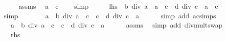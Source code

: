 \begin{isabellebody}
%
\isatagproof
{}\isamarkupfalse%
\ {\isacharminus}{\kern0pt}\isanewline
\ \ \isamarkupfalse%
\ assms\ \isamarkupfalse%
\ {\isachardoublequoteopen}a\ {\isacharasterisk}{\kern0pt}\ c\ {\isasymnoteq}\ {}{\isachardoublequoteclose}\ \isamarkupfalse%
\ simp\isanewline
\ \ \isamarkupfalse%
\ \isamarkupfalse%
\ {\isachardoublequoteopen}{\isacharquery}{\kern0pt}lhs\ {\isasymlongleftrightarrow}\ b\ div\ a\ {\isacharasterisk}{\kern0pt}\ {\isacharparenleft}{\kern0pt}a\ {\isacharasterisk}{\kern0pt}\ c{\isacharparenright}{\kern0pt}\ {\isacharequal}{\kern0pt}\ d\ div\ c\ {\isacharasterisk}{\kern0pt}\ {\isacharparenleft}{\kern0pt}a\ {\isacharasterisk}{\kern0pt}\ c{\isacharparenright}{\kern0pt}{\isachardoublequoteclose}\isanewline
\ \ \ \ \isamarkupfalse%
\ simp\isanewline
\ \ \isamarkupfalse%
\ \isamarkupfalse%
\ {\isachardoublequoteopen}{\isasymdots}\ {\isasymlongleftrightarrow}\ {\isacharparenleft}{\kern0pt}a\ {\isacharasterisk}{\kern0pt}\ {\isacharparenleft}{\kern0pt}b\ div\ a{\isacharparenright}{\kern0pt}{\isacharparenright}{\kern0pt}\ {\isacharasterisk}{\kern0pt}\ c\ {\isacharequal}{\kern0pt}\ {\isacharparenleft}{\kern0pt}c\ {\isacharasterisk}{\kern0pt}\ {\isacharparenleft}{\kern0pt}d\ div\ c{\isacharparenright}{\kern0pt}{\isacharparenright}{\kern0pt}\ {\isacharasterisk}{\kern0pt}\ a{\isachardoublequoteclose}\isanewline
\ \ \ \ \isamarkupfalse%
\ {\isacharparenleft}{\kern0pt}simp\ add{\isacharcolon}{\kern0pt}\ ac{\isacharunderscore}{\kern0pt}simps{\isacharparenright}{\kern0pt}\isanewline
\ \ \isamarkupfalse%
\ \isamarkupfalse%
\ {\isachardoublequoteopen}{\isasymdots}\ {\isasymlongleftrightarrow}\ {\isacharparenleft}{\kern0pt}a\ {\isacharasterisk}{\kern0pt}\ b\ div\ a{\isacharparenright}{\kern0pt}\ {\isacharasterisk}{\kern0pt}\ c\ {\isacharequal}{\kern0pt}\ {\isacharparenleft}{\kern0pt}c\ {\isacharasterisk}{\kern0pt}\ d\ div\ c{\isacharparenright}{\kern0pt}\ {\isacharasterisk}{\kern0pt}\ a{\isachardoublequoteclose}\isanewline
\ \ \ \ \isamarkupfalse%
\ assms\ \isamarkupfalse%
\ {\isacharparenleft}{\kern0pt}simp\ add{\isacharcolon}{\kern0pt}\ div{\isacharunderscore}{\kern0pt}mult{\isacharunderscore}{\kern0pt}swap{\isacharparenright}{\kern0pt}\isanewline
\ \ \isamarkupfalse%
\ \isamarkupfalse%
\ {\isachardoublequoteopen}{\isasymdots}\ {\isasymlongleftrightarrow}\ {\isacharquery}{\kern0pt}rhs{\isachardoublequoteclose}\isanewline

\end{isabellebody}
